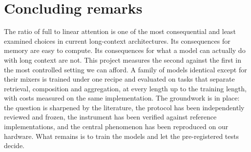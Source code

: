 \documentclass[10pt,a4paper]{article}
\begin{document}
\section{Concluding remarks}

The ratio of full to linear attention is one of the most consequential and least examined
choices in current long-context architectures. Its consequences for memory are easy to compute. Its
consequences for what a model can actually do with long context are not. This project measures
the second against the first in the most controlled setting we can afford. A family of models
identical except for their mixers is trained under one recipe and evaluated on tasks that separate
retrieval, composition and aggregation, at every length up to the training length, with costs
measured on the same implementation. The groundwork is in place: the question is sharpened by the
literature, the protocol has been independently reviewed and frozen, the instrument has been verified
against reference implementations, and the central phenomenon has been reproduced on our hardware.
What remains is to train the models and let the pre-registered tests decide.

\raggedbottom
{}


\end{document}
